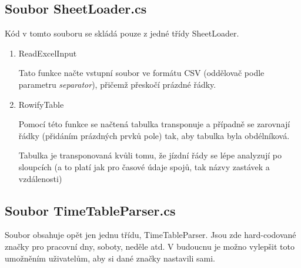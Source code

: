 \documentclass[14pt]{article}
\begin{document}
\subsection{Soubor SheetLoader.cs}

Kód v tomto souboru se skládá pouze z jedné třídy SheetLoader.
\begin{enumerate}

\item ReadExcelInput

Tato funkce načte vstupní soubor ve formátu CSV (oddělovač podle parametru \textit{separator}), přičemž přeskočí prázdné řádky.

\item RowifyTable

Pomocí této funkce se načtená tabulka transponuje a případně se zarovnají řádky (přidáním prázdných prvků pole) tak, aby tabulka byla obdélníková.

Tabulka je transponovaná kvůli tomu, že jízdní řády se lépe analyzují po sloupcích (a to platí jak pro časové údaje spojů, tak názvy zastávek a vzdálenosti)

\end{enumerate}

\subsection{Soubor TimeTableParser.cs}

Soubor obsahuje opět jen jednu třídu, TimeTableParser. Jsou zde hard-codované značky pro pracovní dny, soboty, neděle atd. V budoucnu je možno vylepšit toto umožněním uživatelům, aby si dané značky nastavili sami.
\end{document}
